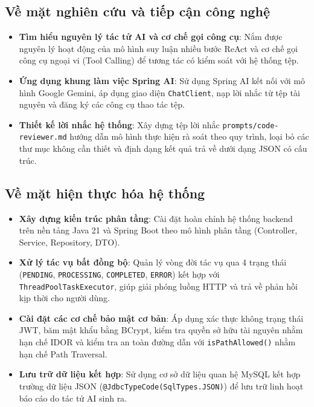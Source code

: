 \documentclass[12pt,a4paper]{report}
\begin{document}
\subsection{Về mặt nghiên cứu và tiếp cận công nghệ}
\begin{itemize}
    \item \textbf{Tìm hiểu nguyên lý tác tử AI và cơ chế gọi công cụ}: Nắm được nguyên lý hoạt động của mô hình suy luận nhiều bước ReAct và cơ chế gọi công cụ ngoại vi (Tool Calling) để tương tác có kiểm soát với hệ thống tệp.
    \item \textbf{Ứng dụng khung làm việc Spring AI}: Sử dụng Spring AI kết nối với mô hình Google Gemini, áp dụng giao diện \texttt{ChatClient}, nạp lời nhắc từ tệp tài nguyên và đăng ký các công cụ thao tác tệp.
    \item \textbf{Thiết kế lời nhắc hệ thống}: Xây dựng tệp lời nhắc \texttt{prompts/code-reviewer.md} hướng dẫn mô hình thực hiện rà soát theo quy trình, loại bỏ các thư mục không cần thiết và định dạng kết quả trả về dưới dạng JSON có cấu trúc.
\end{itemize}

\subsection{Về mặt hiện thực hóa hệ thống}
\begin{itemize}
    \item \textbf{Xây dựng kiến trúc phân tầng}: Cài đặt hoàn chỉnh hệ thống backend trên nền tảng Java 21 và Spring Boot theo mô hình phân tầng (Controller, Service, Repository, DTO).
    \item \textbf{Xử lý tác vụ bất đồng bộ}: Quản lý vòng đời tác vụ qua 4 trạng thái (\texttt{PENDING}, \texttt{PROCESSING}, \texttt{COMPLETED}, \texttt{ERROR}) kết hợp với \texttt{ThreadPoolTaskExecutor}, giúp giải phóng luồng HTTP và trả về phản hồi kịp thời cho người dùng.
    \item \textbf{Cài đặt các cơ chế bảo mật cơ bản}: Áp dụng xác thực không trạng thái JWT, băm mật khẩu bằng BCrypt, kiểm tra quyền sở hữu tài nguyên nhằm hạn chế IDOR và kiểm tra an toàn đường dẫn với \texttt{isPathAllowed()} nhằm hạn chế Path Traversal.
    \item \textbf{Lưu trữ dữ liệu kết hợp}: Sử dụng cơ sở dữ liệu quan hệ MySQL kết hợp trường dữ liệu JSON (\texttt{@JdbcTypeCode(SqlTypes.JSON)}) để lưu trữ linh hoạt báo cáo do tác tử AI sinh ra.
\end{itemize}
\end{document}
